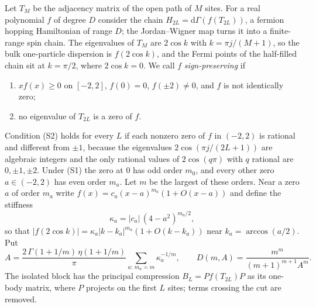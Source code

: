 \documentclass[11pt,a4paper]{article}
\theoremstyle{remark}
\newcommand{\dd}{\mathrm d}
\begin{document}
Let $T_M$ be the adjacency matrix of the open path of $M$ sites. For a real polynomial $f$ of degree $D$ consider the chain $H_{2L}=\dd\Gamma(f(T_{2L}))$, a fermion hopping Hamiltonian of range $D$; the Jordan--Wigner map turns it into a finite-range spin chain. The eigenvalues of $T_M$ are $2\cos k$ with $k=\pi j/(M+1)$, so the bulk one-particle dispersion is $f(2\cos k)$, and the Fermi points of the half-filled chain sit at $k=\pi/2$, where $2\cos k=0$. We call $f$ \emph{sign-preserving} if
\begin{enumerate}[label=(S\arabic*),itemsep=1pt]
\item $xf(x)\ge0$ on $[-2,2]$, $f(0)=0$, $f(\pm2)\ne0$, and $f$ is not identically zero;
\item no eigenvalue of $T_{2L}$ is a zero of $f$.
\end{enumerate}
Condition (S2) holds for every $L$ if each nonzero zero of $f$ in $(-2,2)$ is rational and different from $\pm1$, because the eigenvalues $2\cos(\pi j/(2L+1))$ are algebraic integers and the only rational values of $2\cos(q\pi)$ with $q$ rational are $0,\pm1,\pm2$. Under (S1) the zero at $0$ has odd order $m_0$, and every other zero $a\in(-2,2)$ has even order $m_a$. Let $m$ be the largest of these orders. Near a zero $a$ of order $m_a$ write $f(x)=c_a(x-a)^{m_a}(1+O(x-a))$ and define the stiffness
\[
 \kappa_a=|c_a|\,(4-a^2)^{m_a/2},
\]
so that $|f(2\cos k)|=\kappa_a|k-k_a|^{m_a}(1+O(k-k_a))$ near $k_a=\arccos(a/2)$. Put
\begin{equation}
 A=\frac{2\,\Gamma(1+1/m)\,\eta(1+1/m)}{\pi}\sum_{a:\,m_a=m}\kappa_a^{-1/m},\qquad
 D(m,A)=\frac{m^m}{(m+1)^{m+1}A^m}.
 \label{eq:Aconst}
\end{equation}
The isolated block has the principal compression $B_L=Pf(T_{2L})P$ as its one-body matrix, where $P$ projects on the first $L$ sites; terms crossing the cut are removed.
\end{document}
